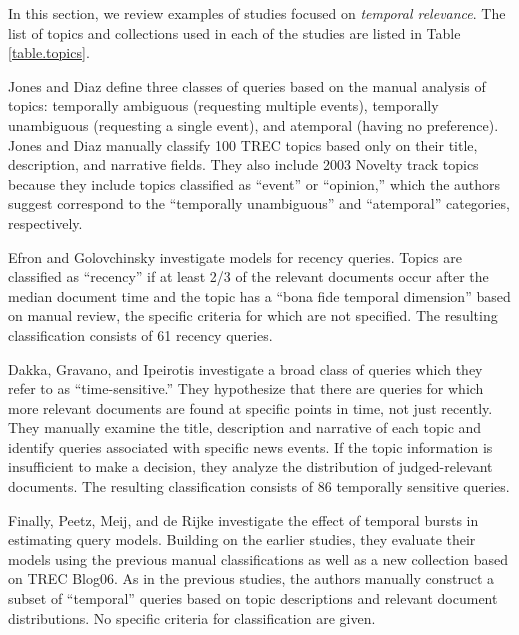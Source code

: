 \documentclass{sig-alternate-05-2015}
\begin{document}
In this section, we review examples of studies focused on \emph{temporal relevance}.  The list of topics and collections used in each of the studies are listed in Table \ref{table.topics}. 

Jones and Diaz \cite{Jones2007} define three classes of queries based on the manual analysis of topics: temporally ambiguous (requesting multiple events),  temporally unambiguous (requesting a single event), and atemporal (having no preference). Jones and Diaz manually classify 100 TREC topics based only on their title, description, and narrative fields.  They also include 2003 Novelty track topics because they include topics classified as ``event'' or ``opinion,'' which the authors suggest correspond to the ``temporally unambiguous'' and ``atemporal'' categories, respectively.

Efron and Golovchinsky \cite{Efron2011} investigate models for recency queries.  Topics are classified as ``recency'' if at least 2/3 of the relevant documents occur after the median document time and the topic has a ``bona fide temporal dimension'' based on manual review, the specific criteria for which are not specified.  The resulting classification consists of 61 recency queries.

Dakka, Gravano, and Ipeirotis  \cite{Dakka2012} investigate a broad class of queries which they refer to as ``time-sensitive.'' They hypothesize that there are queries for which more relevant documents are found at specific points in time, not just recently. They manually examine the title, description and narrative of each topic and identify queries associated with specific news events.  If the topic information is insufficient to make a decision, they analyze the distribution of judged-relevant documents. The resulting classification consists of 86 temporally sensitive queries. 

Finally, Peetz, Meij, and de Rijke \cite{Peetz2013a} investigate the effect of temporal bursts in estimating query models. Building on the earlier studies, they evaluate their models using the previous manual classifications as well as a new collection based on TREC Blog06. As in the previous studies, the authors manually construct a subset of ``temporal'' queries based on topic descriptions and relevant document distributions. No specific criteria for classification are given.
\end{document}
